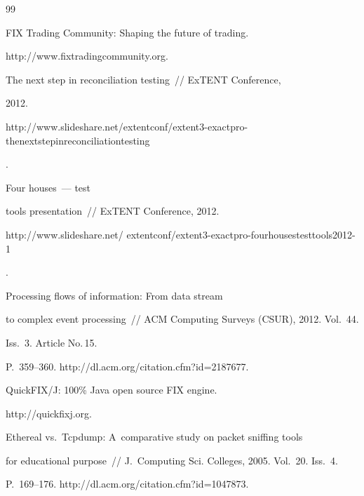 {{\begin{thebibliography}{99}


FIX Trading Community: Shaping the future of trading.


{\sf http://www.\linebreak fixtradingcommunity.org}.







 The next step in reconciliation testing~/\!\!/ ExTENT Conference,


2012. {\sf


http://www.slideshare.net/extentconf/extent3-exactpro-thenextstepinreconciliationtesting}.







 Four houses~--- test


tools presentation~/\!\!/ ExTENT Conference, 2012. {\sf


http://www.slideshare.net/ extentconf/extent3-exactpro-fourhousestesttools2012-1}.










 Processing flows of information: From data stream


to complex event processing~/\!\!/ ACM Computing Surveys (CSUR), 2012. Vol.~44.


Iss.~3. Article No.\,15.


P.~359--360. {\sf http://dl.acm.org/citation.cfm?id=2187677}.







QuickFIX/J: 100\% Java open source FIX engine.


{\sf http://quickfixj.org}.







 Ethereal vs.\ Tcpdump: A~comparative study on packet sniffing tools


for educational purpose~/\!\!/ J.~Computing Sci. Colleges, 2005. Vol.~20. Iss.~4.


P.~169--176. {\sf http://dl.acm.org/citation.cfm?id=1047873}.






\end{thebibliography}}}
